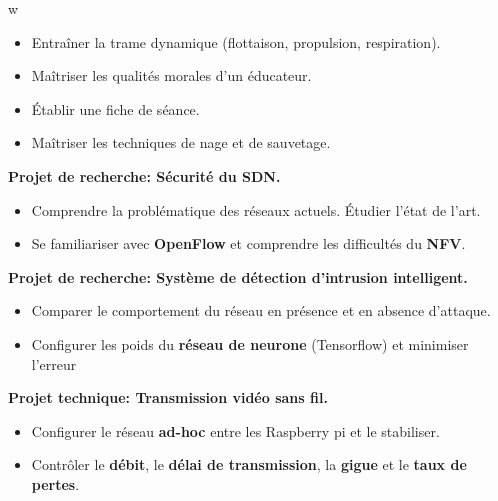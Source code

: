 w\documentclass[10pt,a4paper]{.altacv}
\begin{document}
\divider

\begin{itemize}
	\item Entraîner la trame dynamique (flottaison, propulsion, respiration).
	\item Maîtriser les qualités morales d'un éducateur.
	\item Établir une fiche de séance.
	\item Maîtriser les techniques de nage et de sauvetage.
\end{itemize}



\textbf{\large Projet de recherche: Sécurité du SDN.}
\medskip
\begin{itemize}
	\item Comprendre la problématique des réseaux actuels. Étudier l’état de l’art.
	\item Se familiariser avec \textbf {OpenFlow} et comprendre les difficultés du \textbf {NFV}.
\end{itemize}

\divider

\textbf{\large Projet de recherche: Système de détection d'intrusion intelligent.}
\medskip
\begin{itemize}
	\item Comparer le comportement du réseau en présence et en absence d'attaque.
	\item Configurer les poids du \textbf {réseau de neurone} (Tensorflow) et minimiser l'erreur
\end{itemize}

\divider

\textbf{\large Projet technique: Transmission vidéo sans fil.}
\medskip
\begin{itemize}
	\item Configurer le réseau \textbf {ad-hoc} entre les Raspberry pi et le stabiliser.
	\item Contrôler le \textbf {débit}, le \textbf  {délai de transmission}, la \textbf {gigue} et le \textbf {taux de pertes}.
\end{itemize}

\divider

\end{document}
